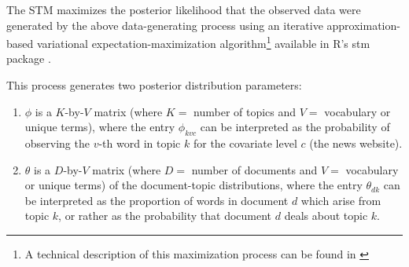 \documentclass[12pt,a4paper,notitlepage]{article}
\begin{document}
The STM maximizes the posterior likelihood that the observed data were generated by the above data-generating process using an iterative approximation-based variational expectation-maximization algorithm\footnote{A technical description of this maximization process can be found in \citet{roberts_model_2016}} available in R's stm package \citep{roberts_stm:_2016}. 

This process generates two posterior distribution parameters: 

\begin{enumerate}
	\item $\phi$ is a $K$-by-$V$ matrix (where $K=$ number of topics and $V=$ vocabulary or unique terms), where the entry $\phi_{kvc}$ can be interpreted as the probability of observing the $v$-th word in topic $k$ for the covariate level $c$ (the news website). 
	\item $\theta$ is a $D$-by-$V$ matrix (where $D=$ number of documents and $V=$ vocabulary or unique terms) of the document-topic distributions, where the entry $\theta_{dk}$ can be interpreted as the proportion of words in document $d$ which arise from topic $k$, or rather as the probability that document $d$ deals about topic $k$. 
\end{enumerate}
\end{document}
